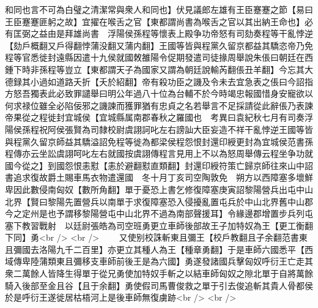 和同也言不可為白璧之清潔常與衆人和同也】伏見議郎左雄有王臣蹇蹇之節【易曰王臣蹇蹇匪躬之故】宜擢在喉舌之官【東都謂尚書為喉舌之官以其出納王命也】必有匡弼之益由是拜雄尚書　浮陽侯孫程等懷表上殿争功帝怒有司劾奏程等干亂悖逆【劾戶概翻又戶得翻悖蒲没翻又蒲内翻】王國等皆與程黨久留京都益其驕恣帝乃免程等官悉徙封遠縣因遣十九侯就國敇雒陽令促期發遣司徒掾周舉說朱倀曰朝廷在西鍾下時非孫程等豈立【東都謂天子為國家又謂為朝廷說輸芮翻倀丑羊翻】今忘其大德録其小過如道路夭折【夭於紹翻】帝有殺功臣之譏及令未去宜急表之倀曰今詔指方怒吾獨表此必致罪譴舉曰明公年過八十位為台輔不於今時竭忠報國惜身安寵欲以何求禄位雖全必陷佞邪之譏諫而獲罪猶有忠貞之名若舉言不足採請從此辭倀乃表諫帝果從之程徙封宜城侯【宜城縣属南郡春秋之羅國也　考異曰袁紀秋七月有司奏浮陽侯孫程祝阿侯張賢為司隸校尉虞詡訶叱左右謗訕大臣妄造不祥干亂悖逆王國等皆與程黨久留京師益其驕溢詔免程等徙為都梁侯程怨恨封還印綬更封為宜城侯范書孫程傳亦云坐訟虞詡呵叱左右就國按虞詡傳程言見用上不以為怒周舉傳云程坐争功就國今從之】到國怨恨恚懟【恚於避翻懟直類翻】封還印綬符策亡歸京師往來山中詔書追求復故爵土賜車馬衣物遣還國　冬十月丁亥司空陶敦免　朔方以西障塞多壞鮮卑因此數侵南匈奴【數所角翻】單于憂恐上書乞修復障塞庚寅詔黎陽營兵出屯中山北界【賢曰黎陽先置營兵以南單于求復障塞恐入侵擾亂置屯兵於中山北界舊中山郡今之定州是也予謂移黎陽營屯中山北界不過為南部聲援耳】令緣邊郡增置步兵列屯塞下教習戰射　以廷尉張皓為司空班勇更立車師後部故王子加特奴為王【更工衡翻下同】勇<br />
<br />
　　又使别校誅斬東且彌王【校戶教翻且子余翻范書東且彌國去洛陽九千二百里】亦更立其種人為王【種章勇翻】于是車師六國悉平【西域傳卑陸蒲類東且彌移支車師前後王是為六國】勇遂發諸國兵擊匈奴呼衍王亡走其衆二萬餘人皆降生得單于從兄勇使加特奴手斬之以結車師匈奴之隙北單于自將萬餘騎入後部至金且谷【且于余翻】勇使假司馬曹俊救之單于引去俊追斬其貴人骨都侯於是呼衍王遂徙居枯梧河上是後車師無復虜跡<br />
<br />
